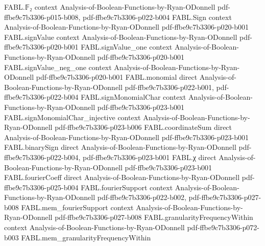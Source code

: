 \begin{theorem}
\label{FABL.tribesCriticalCoordinateInfluenceRelativeError_isLittleO_one}
\leanok
{}
\proofstep
  {FABL.𝔽₂}
  {context}
  {Analysis-of-Boolean-Functions-by-Ryan-ODonnell}
  {pdf-ffbe9c7b3306-p015-b008,
    pdf-ffbe9c7b3306-p022-b004}
\proofstep
  {FABL.Sign}
  {context}
  {Analysis-of-Boolean-Functions-by-Ryan-ODonnell}
  {pdf-ffbe9c7b3306-p020-b001}
\proofstep
  {FABL.signValue}
  {context}
  {Analysis-of-Boolean-Functions-by-Ryan-ODonnell}
  {pdf-ffbe9c7b3306-p020-b001}
\proofstep
  {FABL.signValue_one}
  {context}
  {Analysis-of-Boolean-Functions-by-Ryan-ODonnell}
  {pdf-ffbe9c7b3306-p020-b001}
\proofstep
  {FABL.signValue_neg_one}
  {context}
  {Analysis-of-Boolean-Functions-by-Ryan-ODonnell}
  {pdf-ffbe9c7b3306-p020-b001}
\proofstep
  {FABL.monomial}
  {direct}
  {Analysis-of-Boolean-Functions-by-Ryan-ODonnell}
  {pdf-ffbe9c7b3306-p022-b001,
    pdf-ffbe9c7b3306-p022-b004}
\proofstep
  {FABL.signMonomialChar}
  {context}
  {Analysis-of-Boolean-Functions-by-Ryan-ODonnell}
  {pdf-ffbe9c7b3306-p023-b001}
\proofstep
  {FABL.signMonomialChar_injective}
  {context}
  {Analysis-of-Boolean-Functions-by-Ryan-ODonnell}
  {pdf-ffbe9c7b3306-p023-b006}
\proofstep
  {FABL.coordinateSum}
  {direct}
  {Analysis-of-Boolean-Functions-by-Ryan-ODonnell}
  {pdf-ffbe9c7b3306-p023-b001}
\proofstep
  {FABL.binarySign}
  {direct}
  {Analysis-of-Boolean-Functions-by-Ryan-ODonnell}
  {pdf-ffbe9c7b3306-p022-b004,
    pdf-ffbe9c7b3306-p023-b001}
\proofstep
  {FABL.χ}
  {direct}
  {Analysis-of-Boolean-Functions-by-Ryan-ODonnell}
  {pdf-ffbe9c7b3306-p023-b001}
\proofstep
  {FABL.fourierCoeff}
  {direct}
  {Analysis-of-Boolean-Functions-by-Ryan-ODonnell}
  {pdf-ffbe9c7b3306-p025-b004}
\proofstep
  {FABL.fourierSupport}
  {context}
  {Analysis-of-Boolean-Functions-by-Ryan-ODonnell}
  {pdf-ffbe9c7b3306-p022-b002,
    pdf-ffbe9c7b3306-p027-b008}
\proofstep
  {FABL.mem_fourierSupport}
  {context}
  {Analysis-of-Boolean-Functions-by-Ryan-ODonnell}
  {pdf-ffbe9c7b3306-p027-b008}
\proofstep
  {FABL.granularityFrequencyWithin}
  {context}
  {Analysis-of-Boolean-Functions-by-Ryan-ODonnell}
  {pdf-ffbe9c7b3306-p072-b003}
\proofstep
  {FABL.mem_granularityFrequencyWithin}

\end{theorem}

